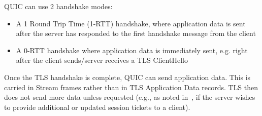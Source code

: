 QUIC can use 2 handshake modes:
\begin{itemize}
    \item  A 1 Round Trip Time (1-RTT) handshake, where application data is sent after the server has responded to the first handshake message from the client
     \item A 0-RTT handshake where application data is immediately sent, e.g. right after the client sends/server receives a TLS ClientHello
\end{itemize}

Once the TLS handshake is complete, QUIC can send application data. This is carried in Stream frames rather than in TLS Application Data records. TLS then does not send more data unless requested (e.g., as noted in~\cite{rfc9001}, if the server wishes to provide additional or updated session tickets to a client).
